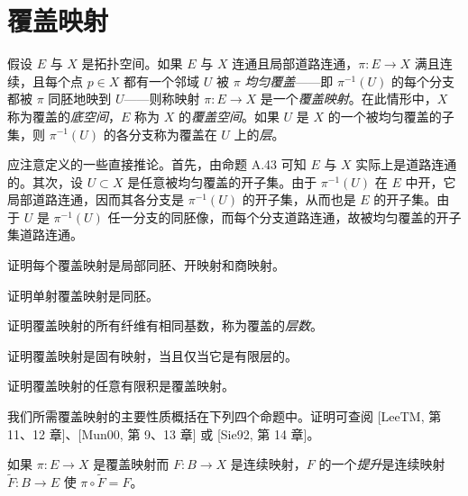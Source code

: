 \documentclass[../../main.tex]{subfiles}
\begin{document}
\section{覆盖映射}\label{section:appA-covering-maps}

假设 $E$ 与 $X$ 是拓扑空间。如果 $E$ 与 $X$ 连通且局部道路连通，$\pi:E\to X$ 满且连续，且每个点 $p\in X$ 都有一个邻域 $U$ 被 $\pi$ \emph{均匀覆盖}——即 $\pi^{-1}(U)$ 的每个分支都被 $\pi$ 同胚地映到 $U$——则称映射 $\pi:E\to X$ 是一个\emph{覆盖映射}。在此情形中，$X$ 称为覆盖的\emph{底空间}，$E$ 称为 $X$ 的\emph{覆盖空间}。如果 $U$ 是 $X$ 的一个被均匀覆盖的子集，则 $\pi^{-1}(U)$ 的各分支称为覆盖在 $U$ 上的\emph{层}。

应注意定义的一些直接推论。首先，由命题 A.43 可知 $E$ 与 $X$ 实际上是道路连通的。其次，设 $U\subset X$ 是任意被均匀覆盖的开子集。由于 $\pi^{-1}(U)$ 在 $E$ 中开，它局部道路连通，因而其各分支是 $\pi^{-1}(U)$ 的开子集，从而也是 $E$ 的开子集。由于 $U$ 是 $\pi^{-1}(U)$ 任一分支的同胚像，而每个分支道路连通，故被均匀覆盖的开子集道路连通。

\begin{exercise}\label{exercise:appA-A-72}
证明每个覆盖映射是局部同胚、开映射和商映射。
\end{exercise}

\begin{exercise}\label{exercise:appA-A-73}
证明单射覆盖映射是同胚。
\end{exercise}

\begin{exercise}\label{exercise:appA-A-74}
证明覆盖映射的所有纤维有相同基数，称为覆盖的\emph{层数}。
\end{exercise}

\begin{exercise}\label{exercise:appA-A-75}
证明覆盖映射是固有映射，当且仅当它是有限层的。
\end{exercise}

\begin{exercise}\label{exercise:appA-A-76}
证明覆盖映射的任意有限积是覆盖映射。
\end{exercise}

我们所需覆盖映射的主要性质概括在下列四个命题中。证明可查阅 [LeeTM, 第 11、12 章]、[Mun00, 第 9、13 章] 或 [Sie92, 第 14 章]。

如果 $\pi:E\to X$ 是覆盖映射而 $F:B\to X$ 是连续映射，$F$ 的一个\emph{提升}是连续映射 $\widetilde F:B\to E$ 使 $\pi\circ\widetilde F=F$。
\end{document}
